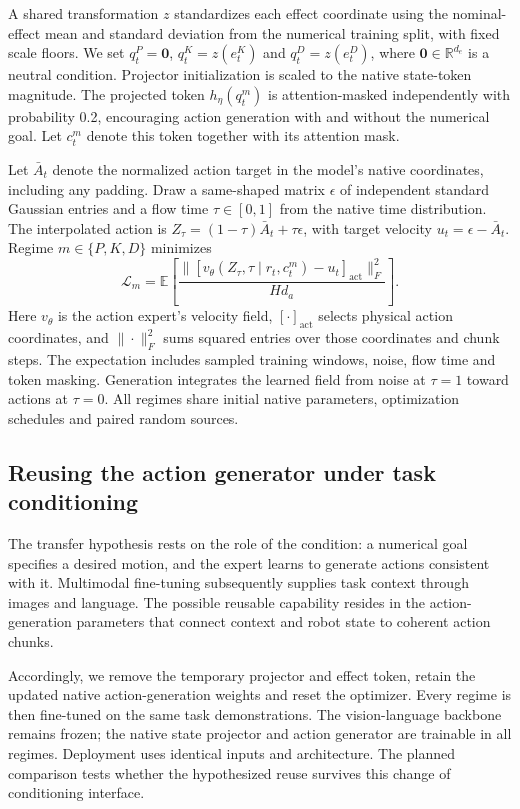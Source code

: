 \documentclass[conference]{IEEEtran}
\newcommand{\E}{\mathbb{E}}
\newcommand{\R}{\mathbb{R}}
\begin{document}
A shared transformation $z$ standardizes each effect coordinate using the nominal-effect mean and standard deviation from the numerical training split, with fixed scale floors. We set $q_t^P=\mathbf 0$, $q_t^K=z(e_t^K)$ and $q_t^D=z(e_t^D)$, where $\mathbf 0\in\R^{d_e}$ is a neutral condition. Projector initialization is scaled to the native state-token magnitude. The projected token $h_\eta(q_t^m)$ is attention-masked independently with probability 0.2, encouraging action generation with and without the numerical goal. Let $c_t^m$ denote this token together with its attention mask.

Let $\bar A_t$ denote the normalized action target in the model's native coordinates, including any padding. Draw a same-shaped matrix $\epsilon$ of independent standard Gaussian entries and a flow time $\tau\in[0,1]$ from the native time distribution. The interpolated action is $Z_\tau=(1-\tau)\bar A_t+\tau\epsilon$, with target velocity $u_t=\epsilon-\bar A_t$. Regime $m\in\{P,K,D\}$ minimizes
\begin{equation}
 \mathcal L_m=\E\!\left[
 \frac{\big\|[v_\theta(Z_\tau,\tau\mid r_t,c_t^m)-u_t]_{\mathrm{act}}\big\|_F^2}
 {H d_a}\right].
 \label{eq:fm}
\end{equation}
Here $v_\theta$ is the action expert's velocity field, $[\cdot]_{\mathrm{act}}$ selects physical action coordinates, and $\|\cdot\|_F^2$ sums squared entries over those coordinates and chunk steps. The expectation includes sampled training windows, noise, flow time and token masking. Generation integrates the learned field from noise at $\tau=1$ toward actions at $\tau=0$. All regimes share initial native parameters, optimization schedules and paired random sources.

\subsection{Reusing the action generator under task conditioning}
The transfer hypothesis rests on the role of the condition: a numerical goal specifies a desired motion, and the expert learns to generate actions consistent with it. Multimodal fine-tuning subsequently supplies task context through images and language. The possible reusable capability resides in the action-generation parameters that connect context and robot state to coherent action chunks.

Accordingly, we remove the temporary projector and effect token, retain the updated native action-generation weights and reset the optimizer. Every regime is then fine-tuned on the same task demonstrations. The vision-language backbone remains frozen; the native state projector and action generator are trainable in all regimes. Deployment uses identical inputs and architecture. The planned comparison tests whether the hypothesized reuse survives this change of conditioning interface.
\end{document}
